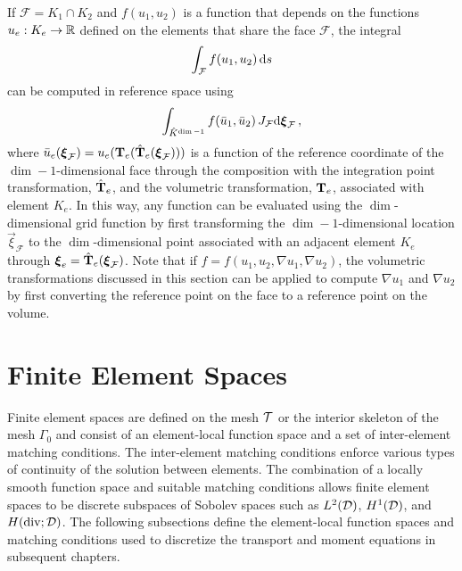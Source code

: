 \documentclass[../doc.tex]{subfiles}
\begin{document}
If $\mathcal{F} = K_1 \cap K_2$ and $f(u_1, u_2)$ is a function that depends on the functions $u_e : K_e \rightarrow \mathbb{R}$ defined on the elements that share the face $\mathcal{F}$, the integral  
	\begin{equation}
		\int_\mathcal{F} f(u_1, u_2) \mathop{}\!\mathrm{d} s 
	\end{equation}
can be computed in reference space using 
	\begin{equation}
		\int_{\hat{K}^{\dim-1}} f(\bar{u}_1, \bar{u}_2)\, J_\mathcal{F}\!\mathop{}\!\mathrm{d} \boldsymbol{\xi}_\mathcal{F} \,, 
	\end{equation}
where $\bar{u}_e(\boldsymbol{\xi}_\mathcal{F}) = u_e(\boldsymbol{\mathrm{T}}_e(\hat{\boldsymbol{\mathrm{T}}}_e(\boldsymbol{\xi}_\mathcal{F})))$ is a function of the reference coordinate of the $\dim-1$-dimensional face through the composition with the integration point transformation, $\hat{\boldsymbol{\mathrm{T}}}_e$, and the volumetric transformation, $\boldsymbol{\mathrm{T}}_e$, associated with element $K_e$. In this way, any function can be evaluated using the $\dim$-dimensional grid function by first transforming the $\dim-1$-dimensional location $\vec{\xi}_\mathcal{F}$ to the $\dim$-dimensional point associated with an adjacent element $K_e$ through $\boldsymbol{\xi}_e = \hat{\boldsymbol{\mathrm{T}}}_e(\boldsymbol{\xi}_\mathcal{F})$. Note that if $f = f(u_1, u_2, \nabla u_1, \nabla u_2)$, the volumetric transformations discussed in this section can be applied to compute $\nabla u_1$ and $\nabla u_2$ by first converting the reference point on the face to a reference point on the volume. 

\section{Finite Element Spaces} \label{fem_sec:fes}
Finite element spaces are defined on the mesh $\mathcal{T}$ or the interior skeleton of the mesh $\Gamma_0$ and consist of an element-local function space and a set of inter-element matching conditions. 
The inter-element matching conditions enforce various types of continuity of the solution between elements. The combination of a locally smooth function space and suitable matching conditions allows finite element spaces to be discrete subspaces of Sobolev spaces such as $L^2(\mathcal{D})$, $H^1(\mathcal{D})$, and $H(\operatorname{div};\mathcal{D})$. The following subsections define the element-local function spaces and matching conditions used to discretize the transport and moment equations in subsequent chapters. 
\end{document}
